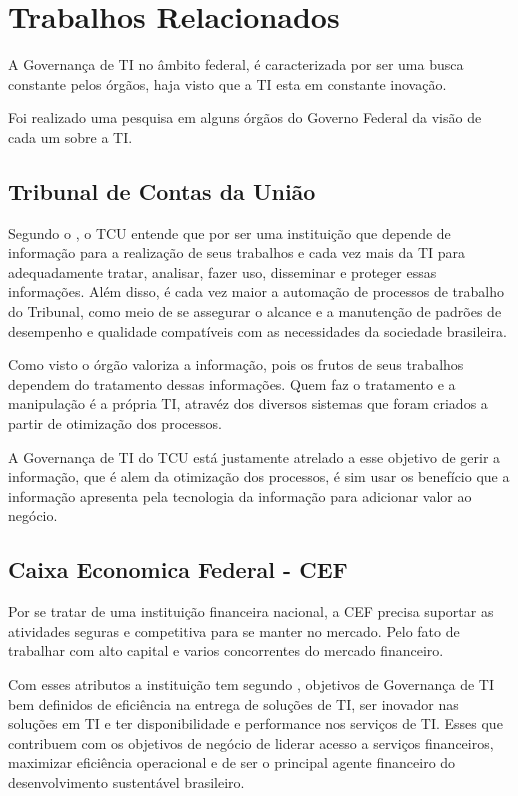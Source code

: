 \section{Trabalhos Relacionados} \label{ses:rela}

A Governança de TI no âmbito federal, é caracterizada por ser uma busca constante pelos órgãos, haja visto que a TI esta em constante inovação.

Foi realizado uma pesquisa em alguns órgãos do Governo Federal da visão de cada um sobre a TI. 

\subsection{Tribunal de Contas da União}

Segundo o \cite{GTI:TCU}, o TCU entende que por ser uma instituição que depende de informação para a realização de seus trabalhos e cada vez mais da TI para adequadamente tratar, analisar, fazer uso, disseminar e proteger essas informações. Além disso, é cada vez maior a automação de processos de trabalho do Tribunal, como meio de se assegurar o alcance e a manutenção de padrões de desempenho e qualidade compatíveis com as necessidades da sociedade brasileira.

Como visto o órgão valoriza a informação, pois os frutos de seus trabalhos dependem do tratamento dessas informações. Quem faz o tratamento e a manipulação é a própria TI, atravéz dos diversos sistemas que foram criados a partir de otimização dos processos.

A Governança de TI do TCU está justamente atrelado a esse objetivo de gerir a informação, que é alem da otimização dos processos, é sim usar os benefício que a informação apresenta pela tecnologia da informação para adicionar valor ao negócio.  

\subsection{Caixa Economica Federal - CEF}

Por se tratar de uma instituição financeira nacional, a CEF precisa suportar as atividades seguras e competitiva para se manter no mercado. Pelo fato de trabalhar com alto capital e varios concorrentes do mercado financeiro.

Com esses atributos a instituição tem segundo \cite{Caixa}, objetivos de Governança de TI bem definidos de eficiência na entrega de soluções de TI, ser inovador nas soluções em TI e ter disponibilidade e performance nos serviços de TI. Esses que contribuem com os objetivos de negócio de liderar acesso a serviços financeiros, maximizar eficiência operacional e de ser o principal agente financeiro do desenvolvimento sustentável brasileiro.

